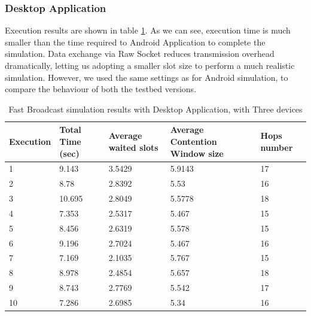 \subsubsection{Desktop Application}

Execution results are shown in table \ref{tab:Desktop_res}. As we can see, execution time is much smaller than the time required to Android Application to complete the simulation. Data exchange via Raw Socket reduces transmission overhead dramatically, letting us  adopting a smaller slot size to perform a much realistic simulation. However, we used the same settings as for Android simulation, to compare the behaviour of both the testbed versions. 

\begin{table}
\caption{Fast Broadcast simulation results with Desktop Application, with Three devices}
\label{tab:Desktop_res}
\centering
\begin{tabular}{|m{}|m{}|m{}|m{}|m{}|}
\hline
Execution & Total \newline Time (sec) & Average waited slots & Average Contention Window size & Hops \newline number \\
\hline
1 & 9.143	& 3.5429	& 5.9143 	& 17 \\
\hline
2 & 8.78	& 2.8392  	& 5.53 		& 16 \\
\hline
3 & 10.695 	& 2.8049	& 5.5778 	& 18 \\
\hline
4 & 7.353 	& 2.5317  	& 5.467 	& 15 \\ 
\hline
5 & 8.456	& 2.6319 	& 5.578		& 15 \\
\hline
6 & 9.196	& 2.7024 	& 5.467		& 16 \\ 
\hline
7 & 7.169	& 2.1035	& 5.767		& 15 \\
\hline
8 & 8.978	& 2.4854	& 5.657		& 18 \\
\hline
9 & 8.743	& 2.7769	& 5.542		& 17 \\
\hline
10 & 7.286	& 2.6985 	& 5.34 		& 16 \\
\hline
\end{tabular}
\end{table}  
